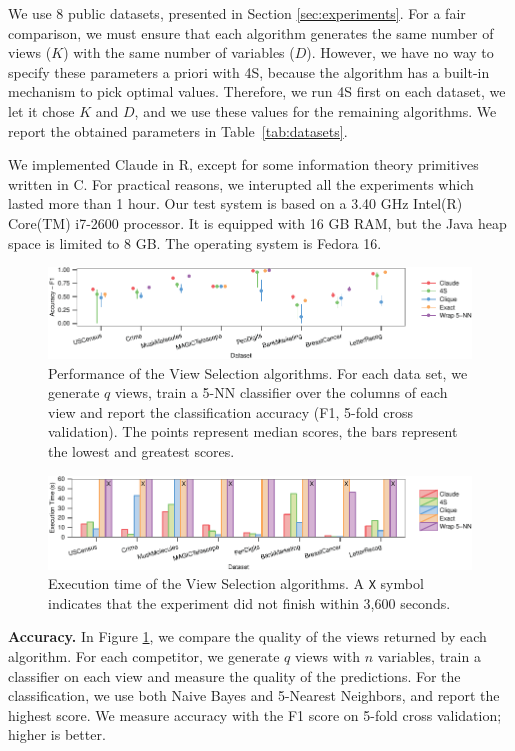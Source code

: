 We use 8 public datasets, presented in Section \ref{sec:experiments}. For a
fair comparison, we must ensure that each algorithm generates the same number
of views ($K$) with the same number of variables ($D$).  However, we have no
way to specify these parameters a priori with 4S, because the algorithm has a
built-in mechanism to pick optimal values. Therefore, we run 4S first on each
dataset, we let it chose $K$ and $D$, and we use these values for the remaining
algorithms.  We report the obtained parameters in Table~\ref{tab:datasets}.

We implemented Claude in R, except for some information theory primitives
written in C. For practical reasons, we interupted all the experiments which
lasted more than 1 hour. Our test system is based on a 3.40 GHz Intel(R)
Core(TM) i7-2600 processor. It is equipped with 16 GB RAM, but the Java heap
space is limited to 8 GB. The operating system is Fedora 16. 

\begin{figure}[t!]
\centering
\includegraphics[width=1.8\columnwidth]{plots/view-scores}
\caption{Performance of the View Selection algorithms. For each data set, we
    generate $q$ views, train a 5-NN classifier over the columns of each view
    and report the classification accuracy (F1, 5-fold cross validation). The
    points represent median scores, the bars represent the lowest and greatest
    scores.} 
\label{pic:column-select-score}
\end{figure}
\begin{figure}[t!]
\centering
\includegraphics[width=1.8\columnwidth]{plots/view-times}
\caption{Execution time of the View Selection algorithms. A \texttt{X} symbol
indicates that the experiment did not finish within 3,600 seconds.}
\label{pic:column-select-time}
\end{figure}

\textbf{Accuracy.} In Figure \ref{pic:column-select-score}, we compare the
quality of the views returned by each algorithm. For each competitor, we
generate $q$ views with $n$ variables, train a classifier on each view and
measure the quality of the predictions. For the classification, we use both
Naive Bayes and 5-Nearest Neighbors, and report the highest score.  We measure
accuracy with the F1 score on 5-fold cross validation; higher is better.

